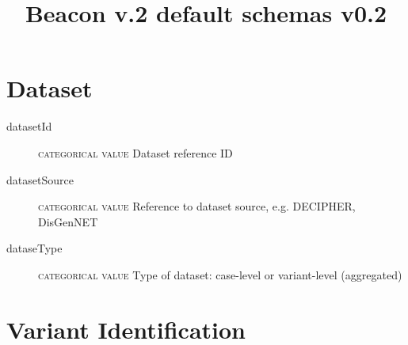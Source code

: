\documentclass[a4paper, 10pt]{article}        %
\begin{document}
\title{Beacon v.2 default schemas v0.2}
\date{} %
\maketitle





 \section*{{\color{teal}Dataset}}
 \begin{description}
  	\item[datasetId] {\textsc{categorical value}} Dataset reference ID
	\item[datasetSource] {\textsc{categorical value}} Reference to dataset source, e.g. DECIPHER, DisGenNET
	\item[dataseType] {\textsc{categorical value}} Type of dataset: case-level or variant-level (aggregated)  
  \end{description}


\section*{{\color{teal}Variant Identification}}

\end{document}
